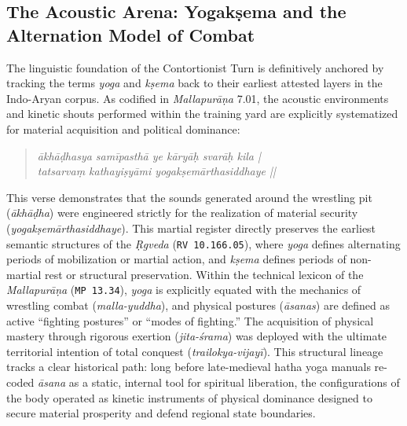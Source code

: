 \documentclass[11pt,letterpaper]{article}
\begin{document}
\subsection{The Acoustic Arena: Yogakṣema and the Alternation Model of Combat}
The linguistic foundation of the Contortionist Turn is definitively anchored by tracking the terms \textit{yoga} and \textit{kṣema} back to their earliest attested layers in the Indo-Aryan corpus. As codified in \textit{Mallapurāṇa} 7.01, the acoustic environments and kinetic shouts performed within the training yard are explicitly systematized for material acquisition and political dominance:
\begin{quotation}
\noindent \textit{ākhāḍhasya samīpasthā ye kāryāḥ svarāḥ kila |} \\
\noindent \textit{tatsarvaṃ kathayiṣyāmi yogakṣemārthasiddhaye ||}
\end{quotation}
This verse demonstrates that the sounds generated around the wrestling pit (\textit{ākhāḍha}) were engineered strictly for the realization of material security (\textit{yogakṣemārthasiddhaye}). This martial register directly preserves the earliest semantic structures of the \textit{Ṛgveda} (\texttt{RV 10.166.05}), where \textit{yoga} defines alternating periods of mobilization or martial action, and \textit{kṣema} defines periods of non-martial rest or structural preservation. Within the technical lexicon of the \textit{Mallapurāṇa} (\texttt{MP 13.34}), \textit{yoga} is explicitly equated with the mechanics of wrestling combat (\textit{malla-yuddha}), and physical postures (\textit{āsanas}) are defined as active ``fighting postures'' or ``modes of fighting.'' The acquisition of physical mastery through rigorous exertion (\textit{jita-śrama}) was deployed with the ultimate territorial intention of total conquest (\textit{trailokya-vijayī}). This structural lineage tracks a clear historical path: long before late-medieval hatha yoga manuals re-coded \textit{āsana} as a static, internal tool for spiritual liberation, the configurations of the body operated as kinetic instruments of physical dominance designed to secure material prosperity and defend regional state boundaries.
\end{document}
